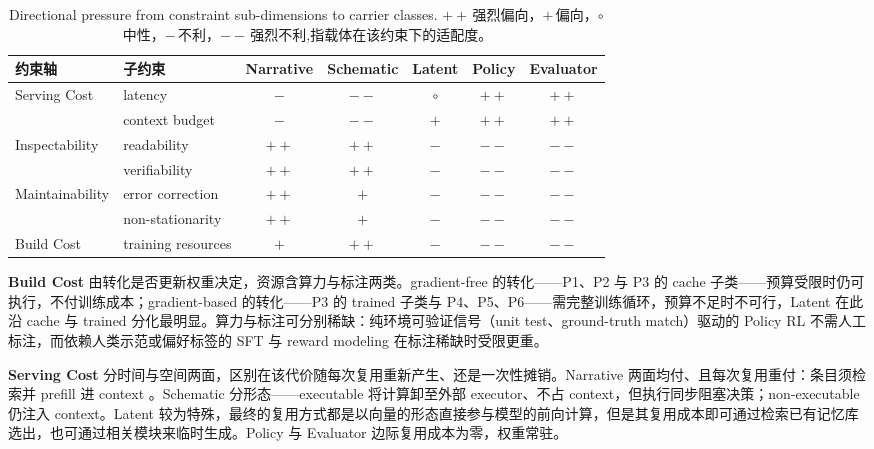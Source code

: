\begin{table}[htbp]
  \centering
  \caption{Directional pressure from constraint sub-dimensions to carrier classes. $\mathtt{++}$\,强烈偏向，$\mathtt{+}$\,偏向，$\circ$\,中性，$\mathtt{-}$\,不利，$\mathtt{{-}{-}}$\,强烈不利,指载体在该约束下的适配度。}
  \label{tab:8.4}
  \begin{tabular}{ll*{5}{c}}
    \toprule
    约束轴 & 子约束 & Narrative & Schematic & Latent & Policy & Evaluator \\
    \midrule
    \multirow{2}{*}{Serving Cost}
      & latency
        & $-$ & $--$ & $\circ$ & $++$ & $++$ \\
    \cmidrule(l){2-7}
      & context budget
        & $-$ & $--$ & $+$ & $++$ & $++$ \\
    \midrule
    \multirow{2}{*}{Inspectability}
      & readability
        & $++$ & $++$ & $-$ & $--$ & $--$ \\
    \cmidrule(l){2-7}
      & verifiability
        & $++$ & $++$ & $-$ & $--$ & $--$ \\
    \midrule
    \multirow{2}{*}{Maintainability}
      & error correction
        & $++$ & $+$ & $-$ & $--$ & $--$ \\
    \cmidrule(l){2-7}
      & non-stationarity
        & $++$ & $+$ & $-$ & $--$ & $--$ \\
    \midrule
    Build Cost
      & training resources
        & $+$ & $++$ & $-$ & $--$ & $--$ \\
    \bottomrule
  \end{tabular}
\end{table}

\textbf{Build Cost} 由转化是否更新权重决定，资源含算力与标注两类。gradient-free 的转化——P1、P2 与 P3 的 cache 子类——预算受限时仍可执行，不付训练成本；gradient-based 的转化——P3 的 trained 子类与 P4、P5、P6——需完整训练循环，预算不足时不可行，Latent 在此沿 cache 与 trained 分化最明显。算力与标注可分别稀缺：纯环境可验证信号（unit test、ground-truth match）驱动的 Policy RL 不需人工标注，而依赖人类示范或偏好标签的 SFT 与 reward modeling 在标注稀缺时受限更重。

\textbf{Serving Cost} 分时间与空间两面，区别在该代价随每次复用重新产生、还是一次性摊销。Narrative 两面均付、且每次复用重付：条目须检索并 prefill 进 context \cite{Shi23b, Zha23c}。Schematic 分形态——executable 将计算卸至外部 executor、不占 context，但执行同步阻塞决策；non-executable 仍注入 context。Latent 较为特殊，最终的复用方式都是以向量的形态直接参与模型的前向计算，但是其复用成本即可通过检索已有记忆库选出，也可通过相关模块来临时生成。Policy 与 Evaluator 边际复用成本为零，权重常驻。


